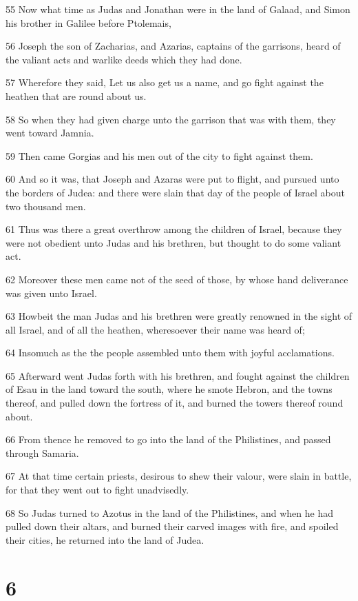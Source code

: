 \par 55 Now what time as Judas and Jonathan were in the land of Galaad, and Simon his brother in Galilee before Ptolemais,
\par 56 Joseph the son of Zacharias, and Azarias, captains of the garrisons, heard of the valiant acts and warlike deeds which they had done.
\par 57 Wherefore they said, Let us also get us a name, and go fight against the heathen that are round about us.
\par 58 So when they had given charge unto the garrison that was with them, they went toward Jamnia.
\par 59 Then came Gorgias and his men out of the city to fight against them.
\par 60 And so it was, that Joseph and Azaras were put to flight, and pursued unto the borders of Judea: and there were slain that day of the people of Israel about two thousand men.
\par 61 Thus was there a great overthrow among the children of Israel, because they were not obedient unto Judas and his brethren, but thought to do some valiant act.
\par 62 Moreover these men came not of the seed of those, by whose hand deliverance was given unto Israel.
\par 63 Howbeit the man Judas and his brethren were greatly renowned in the sight of all Israel, and of all the heathen, wheresoever their name was heard of;
\par 64 Insomuch as the the people assembled unto them with joyful acclamations.
\par 65 Afterward went Judas forth with his brethren, and fought against the children of Esau in the land toward the south, where he smote Hebron, and the towns thereof, and pulled down the fortress of it, and burned the towers thereof round about.
\par 66 From thence he removed to go into the land of the Philistines, and passed through Samaria.
\par 67 At that time certain priests, desirous to shew their valour, were slain in battle, for that they went out to fight unadvisedly.
\par 68 So Judas turned to Azotus in the land of the Philistines, and when he had pulled down their altars, and burned their carved images with fire, and spoiled their cities, he returned into the land of Judea.

\chapter{6}

